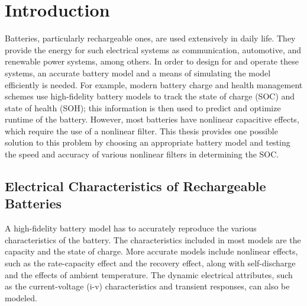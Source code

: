 \documentclass[../zhang_thesis.tex]{subfiles}
\begin{document}
\chapter{Introduction}

Batteries, particularly rechargeable ones, are used extensively in daily life. They provide the energy for such electrical systems as communication, automotive, and renewable power systems, among others. In order to design for and operate these systems, an accurate battery model and a means of simulating the model efficiently is needed. For example, modern battery charge and health management schemes use high-fidelity battery models to track the state of charge (SOC) and state of
health (SOH); this information is then used to predict and optimize runtime of the battery. However, most batteries have nonlinear capacitive effects, which require the use of a nonlinear filter. This thesis provides one possible solution to this problem by choosing an appropriate battery model and testing the speed and accuracy of various nonlinear filters in determining the SOC.


\section{Electrical Characteristics of Rechargeable Batteries}

A high-fidelity battery model has to accurately reproduce the various characteristics of the battery. The characteristics included in most models are the capacity and the state of charge. More accurate models include nonlinear effects, such as the rate-capacity effect and the recovery effect, along with self-discharge and the effects of ambient temperature. The dynamic electrical attributes, such as the current-voltage (i-v) characteristics and transient responses, can also be modeled.
\end{document}
